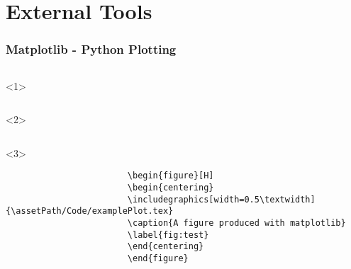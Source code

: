 \documentclass{beamer}
\begin{document}
    \section{External Tools}
        \begin{frame}[t,fragile]
            \frametitle{Matplotlib - Python Plotting}
            \begin{columns}[onlytextwidth]
                \begin{column}[T]{0.75\textwidth}
                    \begin{onlyenv}<1>
                        \inputminted{python}{\assetPath/Code/matplotlibexample.py}
                    \end{onlyenv}
                    \begin{onlyenv}<2>
                        \inputminted[firstline=29,lastline=45]{latex}{\assetPath/Code/examplePlot.tex}
                    \end{onlyenv}
                    \begin{onlyenv}<3>
                        \begin{verbatim}
                        \begin{figure}[H]
                        \begin{centering}
                        \includegraphics[width=0.5\textwidth] {\assetPath/Code/examplePlot.tex}
                        \caption{A figure produced with matplotlib}
                        \label{fig:test}
                        \end{centering}
                        \end{figure}
                        \end{verbatim}
                    \end{onlyenv}
                \end{column}\hfill
                \begin{column}[T]{0.2\textwidth}
                    \centering
                    
                \end{column}
            \end{columns}
        \end{frame}
\end{document}
